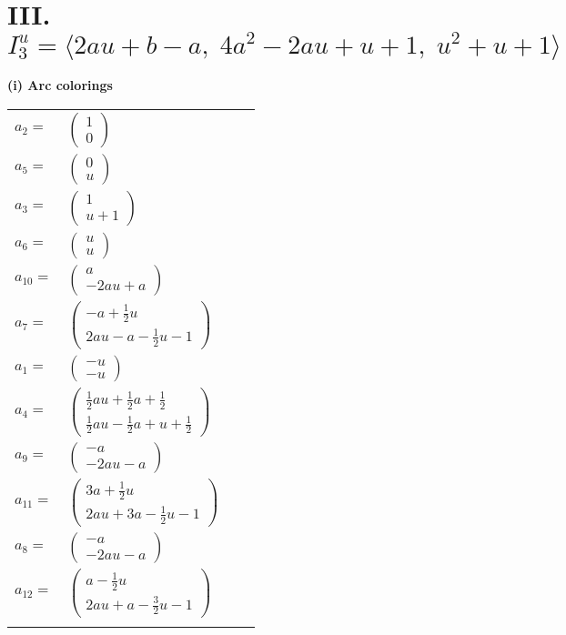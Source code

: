 \documentclass[1p]{elsarticle_modified}
\theoremstyle{definition}
\begin{document}
\centering \section*{III. $I^u_{3}= \langle 2 a u+b- a,\;4 a^2-2 a u+u+1,\;u^2+u+1 \rangle$}
\flushleft \textbf{(i) Arc colorings}\\
\begin{tabular}{m{7pt} m{180pt} m{7pt} m{180pt} }
\flushright $a_{2}=$&$\begin{pmatrix}1\\0\end{pmatrix}$ \\
\flushright $a_{5}=$&$\begin{pmatrix}0\\u\end{pmatrix}$ \\
\flushright $a_{3}=$&$\begin{pmatrix}1\\u+1\end{pmatrix}$ \\
\flushright $a_{6}=$&$\begin{pmatrix}u\\u\end{pmatrix}$ \\
\flushright $a_{10}=$&$\begin{pmatrix}a\\-2 a u+a\end{pmatrix}$ \\
\flushright $a_{7}=$&$\begin{pmatrix}- a+\frac{1}{2} u\\2 a u- a-\frac{1}{2} u-1\end{pmatrix}$ \\
\flushright $a_{1}=$&$\begin{pmatrix}- u\\- u\end{pmatrix}$ \\
\flushright $a_{4}=$&$\begin{pmatrix}\frac{1}{2} a u+\frac{1}{2} a+\frac{1}{2}\\\frac{1}{2} a u-\frac{1}{2} a+u+\frac{1}{2}\end{pmatrix}$ \\
\flushright $a_{9}=$&$\begin{pmatrix}- a\\-2 a u- a\end{pmatrix}$ \\
\flushright $a_{11}=$&$\begin{pmatrix}3 a+\frac{1}{2} u\\2 a u+3 a-\frac{1}{2} u-1\end{pmatrix}$ \\
\flushright $a_{8}=$&$\begin{pmatrix}- a\\-2 a u- a\end{pmatrix}$ \\
\flushright $a_{12}=$&$\begin{pmatrix}a-\frac{1}{2} u\\2 a u+a-\frac{3}{2} u-1\end{pmatrix}$\\&\end{tabular}
\end{document}

